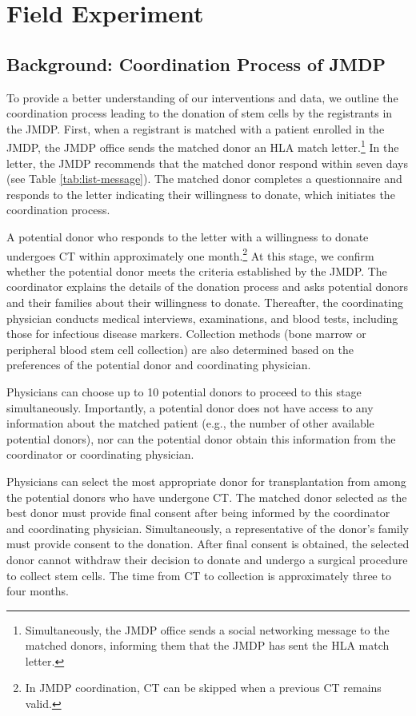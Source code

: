\documentclass[12pt, a4paper]{article}
\begin{document}
\hypertarget{experiment}{%
\section{Field Experiment}\label{experiment}}

\hypertarget{background}{%
\subsection{Background: Coordination Process of JMDP}\label{background}}

To provide a better understanding of our interventions and data, we outline the coordination process leading to the donation of stem cells by the registrants in the JMDP. First, when a registrant is matched with a patient enrolled in the JMDP, the JMDP office sends the matched donor an HLA match letter.\footnote{Simultaneously, the JMDP office sends a social networking message to the matched donors, informing them that the JMDP has sent the HLA match letter.} In the letter, the JMDP recommends that the matched donor respond within seven days (see Table \ref{tab:list-message}). The matched donor completes a questionnaire and responds to the letter indicating their willingness to donate, which initiates the coordination process.

A potential donor who responds to the letter with a willingness to donate undergoes CT within approximately one month.\footnote{In JMDP coordination, CT can be skipped when a previous CT remains valid.} At this stage, we confirm whether the potential donor meets the criteria established by the JMDP. The coordinator explains the details of the donation process and asks potential donors and their families about their willingness to donate. Thereafter, the coordinating physician conducts medical interviews, examinations, and blood tests, including those for infectious disease markers. Collection methods (bone marrow or peripheral blood stem cell collection) are also determined based on the preferences of the potential donor and coordinating physician.

Physicians can choose up to 10 potential donors to proceed to this stage simultaneously. Importantly, a potential donor does not have access to any information about the matched patient (e.g., the number of other available potential donors), nor can the potential donor obtain this information from the coordinator or coordinating physician.

Physicians can select the most appropriate donor for transplantation from among the potential donors who have undergone CT. The matched donor selected as the best donor must provide final consent after being informed by the coordinator and coordinating physician. Simultaneously, a representative of the donor's family must provide consent to the donation. After final consent is obtained, the selected donor cannot withdraw their decision to donate and undergo a surgical procedure to collect stem cells. The time from CT to collection is approximately three to four months.
\end{document}
